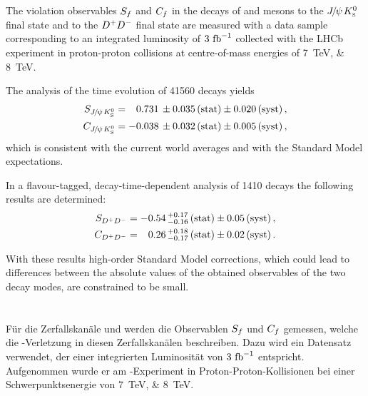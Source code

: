 
\section*{\centering\abstractname}
The \CP violation observables $S_{f}$ and $C_{f}$ in the decays of \Bd and \Bzb mesons
to the ${{J\mskip -3mu/\mskip -2mu\psi\mskip 2mu}}{{K}^0_{\mathrm{ \scriptscriptstyle S}}}$ final state and to the ${{D}^+}{{D}^-}$ final state are measured with
a data sample corresponding to an integrated luminosity of $\SI{3}{\ensuremath{\mbox{\,fb}^{-1}}}$
collected with the LHCb experiment in proton-proton collisions at
centre-of-mass energies of \SIlist{7;8}{\TeV}.

The analysis of the time evolution of \num{41560} \BdToJPsiKS decays yields
\begin{align*}
  S_{{{J\mskip -3mu/\mskip -2mu\psi\mskip 2mu}}{{K}^0_{\mathrm{ \scriptscriptstyle S}}}} &=  \phantom{-}0.731 \, \pm 0.035 \, \text{(stat)} \pm 0.020 \, \text{(syst)}\,, \\
  C_{{{J\mskip -3mu/\mskip -2mu\psi\mskip 2mu}}{{K}^0_{\mathrm{ \scriptscriptstyle S}}}} &=  			- 0.038 \, \pm 0.032 \, \text{(stat)} \pm 0.005 \, \text{(syst)}\,,
\end{align*}
which is consistent with the current world averages and with the
Standard Model expectations.

In a flavour-tagged, decay-time-dependent analysis of \num{1410} \BdToDD
decays the following results are determined:
\begin{align*}
  S_{{{D}^+}{{D}^-}} &=  -0.54 \, ^{+0.17}_{-0.16} \, \text{(stat)} \pm 0.05 \, \text{(syst)}\,, \\
  C_{{{D}^+}{{D}^-}} &=  \phantom{-}0.26 \, ^{+0.18}_{-0.17} \, \text{(stat)} \pm 0.02 \, \text{(syst)}\,.
\end{align*}

With these results high-order Standard Model corrections, which could lead to
differences between the absolute values of the obtained observables of the two
decay modes, are constrained to be small.


\section*{\centering\abstractname}
Für die Zerfallskanäle \BdToJPsiKS und \BdToDD werden die Observablen $S_{f}$
und $C_{f}$ gemessen, welche die \CP-Verletzung in diesen Zerfallskanälen
beschreiben. Dazu wird ein Datensatz verwendet, der einer integrierten
Luminosität von $\SI{3}{\ensuremath{\mbox{\,fb}^{-1}}}$ entspricht. Aufgenommen wurde er am
\lhcb-Experiment in Proton-Proton-Kollisionen bei einer Schwerpunktsenergie
von \SIlist[list-pair-separator={ und }]{7;8}{\TeV}.

